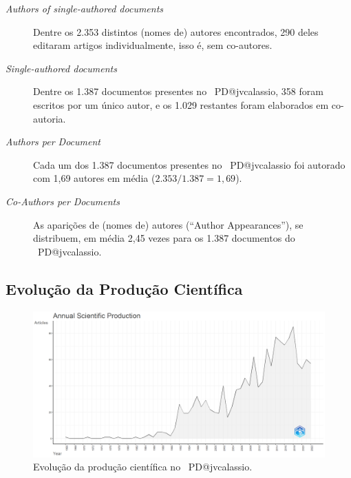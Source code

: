 \begin{description}
    \item [\textit{Authors of single-authored documents}] Dentre os 2.353 distintos (nomes de) autores encontrados, 290 deles editaram artigos individualmente, isso é, sem co-autores.
    \item [\textit{Single-authored documents}] Dentre os 1.387 documentos presentes no \dataset\   PD@jvcalassio, 358 foram escritos por um único autor, e os 1.029 restantes foram elaborados em co-autoria.
    \item [\textit{Authors per Document}] Cada um dos 1.387 documentos presentes no \dataset\   PD@jvcalassio foi autorado com 1,69 autores em média ($2.353 / 1.387 = 1,69$).
    \item [\textit{Co-Authors per Documents}] As aparições de (nomes de) autores (``Author Appearances''), se distribuem, em média 2,45 vezes para os 1.387 documentos do \dataset\   PD@jvcalassio.
\end{description}



\subsection{Evolução da Produção Científica}

\begin{figure}
    \centering
    \includegraphics[width=1\textwidth]{exploratory-data-analysis/jvcalassio/PesqBibliogr/PrisonersDilemma/WoS-20221201/Dataset/AnnualScientificProduction-2022-12-01.png}
    \caption{Evolução da produção científica no \dataset\   PD@jvcalassio.}
    \label{fig:evol:anual:PD@jvcalassio}
\end{figure}

